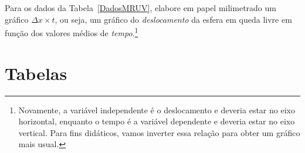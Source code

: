 \begin{question}[type={exam}]
Para os dados da Tabela~\ref{DadosMRUV}, elabore em papel milimetrado um gráfico $\Delta x \times t$, ou seja, um gráfico do \emph{deslocamento} da esfera em queda livre em função dos valores médios de \emph{tempo}.\footnote{Novamente, a variável independente é o deslocamento e deveria estar no eixo horizontal, enquanto o tempo é a variável dependente e deveria estar no eixo vertical. Para fins didáticos, vamos inverter essa relação para obter um gráfico mais usual.}
\end{question}
\vfill
\pagebreak
\section{Tabelas}

